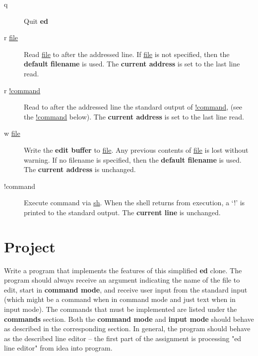 \documentclass[a4paper,10pt]{article}
\begin{document}
\begin{description}
    \item[q] Quit \textbf{ed}
    
    \item[r \underline{file}] Read \underline{file} to after the addressed line.  If \underline{file} is not specified,
            then the \textbf{default filename} is used. The \textbf{current address} is set to the last line read.

    \item[r \underline{!command}] Read to after the addressed line the standard output of \underline{!command},
            (see the \underline{!command} below). The \textbf{current address} is set to the last line read.


    \item[w \underline{file}] Write the \textbf{edit buffer} to \underline{file}. Any previous contents of \underline{file}
             is lost without warning. If no filename is specified, then the \textbf{default filename} is used.
             The \textbf{current address} is unchanged.

    \item[!command]
             Execute command via \underline{sh}. When
             the shell returns from execution, a ‘!’ is printed to the standard
             output.  The \textbf{current line} is unchanged.

\end{description}

\section{Project}

Write a program that implements the features of this simplified \textbf{ed}
clone. The program should always receive an argument indicating the name of the
file to edit, start in \textbf{command mode}, and receive user input from the
standard input (which might be a command when in command mode and just text
when in input mode). The commands that must be implemented are listed under the
\textbf{commands} section. Both the \textbf{command mode} and \textbf{input
mode} should behave as described in the corresponding section. In general, the
program should behave as the described line editor -- the first part of the
assignment is processing "ed line editor" from idea into program.
\end{document}
